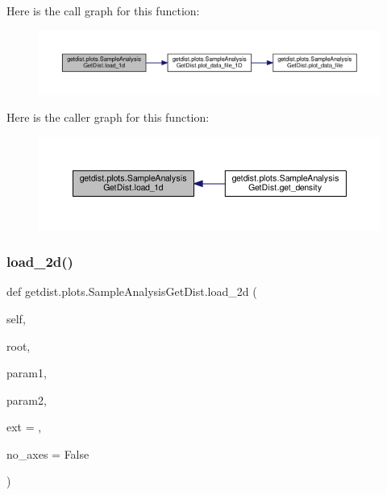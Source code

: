 Here is the call graph for this function\+:
\nopagebreak
\begin{figure}[H]
\begin{center}
\leavevmode
\includegraphics[width=350pt]{classgetdist_1_1plots_1_1SampleAnalysisGetDist_af7814cfa5b531528542279c3d50473c7_cgraph}
\end{center}
\end{figure}
Here is the caller graph for this function\+:
\nopagebreak
\begin{figure}[H]
\begin{center}
\leavevmode
\includegraphics[width=350pt]{classgetdist_1_1plots_1_1SampleAnalysisGetDist_af7814cfa5b531528542279c3d50473c7_icgraph}
\end{center}
\end{figure}
\mbox{\label{classgetdist_1_1plots_1_1SampleAnalysisGetDist_a5c17cd9e2e043ccaaced32d01f4f42f8}} 
\subsubsection{\texorpdfstring{load\+\_\+2d()}{load\_2d()}}
{\footnotesize\ttfamily def getdist.\+plots.\+Sample\+Analysis\+Get\+Dist.\+load\+\_\+2d (\begin{DoxyParamCaption}\item[{}]{self,  }\item[{}]{root,  }\item[{}]{param1,  }\item[{}]{param2,  }\item[{}]{ext = {\ttfamily \textquotesingle{}\textquotesingle{}},  }\item[{}]{no\+\_\+axes = {\ttfamily False} }\end{DoxyParamCaption})}



